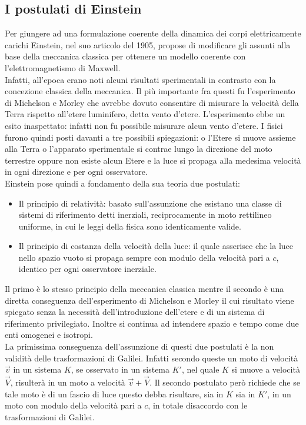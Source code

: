 \subsection{I postulati di Einstein}\label{Sec:postulati}
Per giungere ad una formulazione coerente della dinamica dei corpi elettricamente carichi Einstein, nel suo articolo \cite{Einstein1905} del 1905, propose di modificare gli assunti alla base della meccanica classica per ottenere un modello coerente con l'elettromagnetismo di Maxwell.\\Infatti, all'epoca erano noti alcuni risultati sperimentali in contrasto con la concezione classica della meccanica. Il più importante fra questi fu l'esperimento di Michelson e Morley che avrebbe dovuto consentire di misurare la velocità della Terra rispetto all'etere luminifero, detta vento d'etere. L'esperimento ebbe un esito inaspettato: infatti non fu possibile misurare alcun vento d'etere. I fisici furono quindi posti davanti a tre possibili spiegazioni: o l'Etere si muove assieme alla Terra o l'apparato sperimentale si contrae lungo la direzione del moto terrestre oppure non esiste alcun Etere e la luce si propaga alla medesima velocità in ogni direzione e per ogni osservatore.\\
Einstein pose quindi a fondamento della sua teoria due postulati:
\begin{itemize}
    \item Il principio di relatività: basato sull'assunzione che esistano  una classe di sistemi di riferimento detti inerziali, reciprocamente in moto rettilineo uniforme, in cui le leggi della fisica sono identicamente valide.
    \item Il principio di costanza della velocità della luce: il quale asserisce che la luce nello spazio vuoto si propaga sempre con modulo della velocità pari a $c$, identico per ogni osservatore inerziale. 
\end{itemize}
Il primo è lo stesso principio della meccanica classica mentre il secondo è una diretta conseguenza dell'esperimento di Michelson e Morley il cui risultato viene spiegato senza la necessità dell'introduzione dell'etere e di un sistema di riferimento privilegiato. Inoltre si continua ad intendere spazio e tempo come due enti omogenei e isotropi.\\

La primissima conseguenza dell'assunzione di questi due postulati è la non validità delle trasformazioni di Galilei. Infatti secondo queste un moto di velocità $\vec{v}$ in un sistema $K$, se osservato in un sistema $K'$, nel quale $K$ si muove a velocità $\vec{V}$, risulterà in un moto a velocità $\vec{v}+\vec{V}$. Il secondo postulato però richiede che se tale moto è di un fascio di luce questo debba risultare, sia in $K$ sia in $K'$, in un moto con modulo della velocità pari a $c$, in totale disaccordo con le trasformazioni di Galilei.\\

